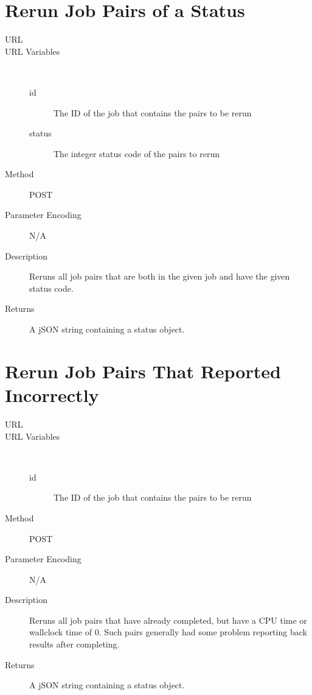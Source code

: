 \section{Rerun Job Pairs of a Status}
\begin{description}
\item [URL] 
\item [URL Variables] \
	\begin{description}
	\item [id]  The ID of the job that contains the pairs to be rerun
	\item [status] \type{Integer} The integer status code of the pairs to rerun
	\end{description}
\item [Method] POST
\item [Parameter Encoding] N/A
\item [Description] Reruns all job pairs that are both in the given job and have the given status code.
\item [Returns] A jSON string containing a status object.
\end{description}


\section{Rerun Job Pairs That Reported Incorrectly}
\begin{description}
\item [URL] 
\item [URL Variables] \
	\begin{description}
	\item [id]  The ID of the job that contains the pairs to be rerun
	\end{description}
\item [Method] POST
\item [Parameter Encoding] N/A
\item [Description] Reruns all job pairs that have already completed, but have a CPU time or wallclock time of 0. Such pairs generally had some problem reporting back results after completing.
\item [Returns] A jSON string containing a status object.
\end{description}


